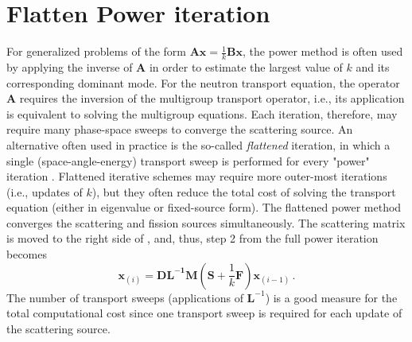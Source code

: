 \section{Flatten Power iteration}
For generalized problems of the form $\mathbf{Ax}= \frac{1}{k} \mathbf{Bx}$, the power method is often used by applying the inverse of $\mathbf{A}$ in order to estimate the largest value of $k$ and its corresponding dominant mode.
For the neutron transport equation, the operator $\mathbf{A}$ requires the inversion of the multigroup transport operator, i.e., its application is equivalent to solving the multigroup equations.
Each iteration, therefore, may require many phase-space sweeps to converge the scattering source.
An alternative often used in practice is the so-called {\it flattened} iteration, in which a single (space-angle-energy) transport sweep is performed for every "power" iteration .
Flattened iterative schemes may require more outer-most iterations (i.e., updates of $k$), but they often reduce the total cost of solving the transport equation (either in eigenvalue  or fixed-source form).
The flattened power method converges the scattering and fission sources simultaneously.
The scattering matrix is moved to the right side of , and, thus, step 2 from the full power iteration becomes
\begin{equation}
 \mathbf{x}_{(i)} =  \mathbf{DL^{-1}M} (\mathbf{S} + \frac{1}{k} \mathbf{F})\mathbf{x}_{(i-1)}   \, .
 \label{eq:flatten}
\end{equation}
The number of transport sweeps (applications of $\mathbf{L}^{-1}$) is a good measure for the total computational cost since one transport sweep is required for each update of the scattering source.